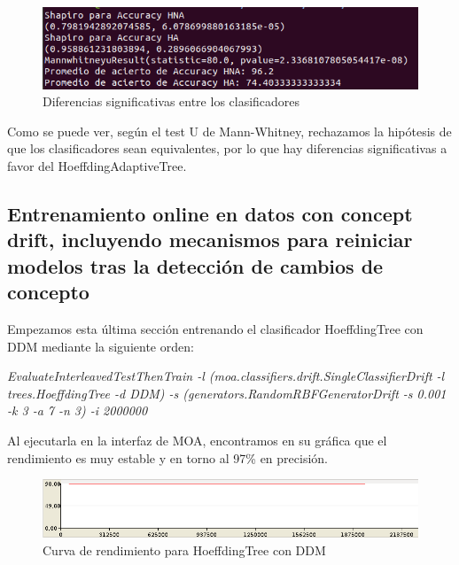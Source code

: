 \begin{figure}[H] %
	\centering
	\includegraphics[scale=0.5]{test4.png}  %
	\caption{Diferencias significativas entre los clasificadores} 
	\label{fig:test4}
\end{figure}

Como se puede ver, según el test U de Mann-Whitney, rechazamos la hipótesis de que los clasificadores sean equivalentes, por lo que hay diferencias significativas a favor del HoeffdingAdaptiveTree.

\subsection{Entrenamiento online en datos con concept drift, incluyendo mecanismos para reiniciar modelos tras la detección de cambios de concepto}

Empezamos esta última sección entrenando el clasificador HoeffdingTree con DDM mediante la siguiente orden:

\textit{EvaluateInterleavedTestThenTrain -l (moa.classifiers.drift.SingleClassifierDrift -l trees.HoeffdingTree -d DDM) -s (generators.RandomRBFGeneratorDrift -s 0.001 -k 3 -a 7 -n 3) -i 2000000}

Al ejecutarla en la interfaz de MOA, encontramos en su gráfica que el rendimiento es muy estable y en torno al 97\% en precisión.

\begin{figure}[H] %
	\centering
	\includegraphics[scale=0.5]{graph51.png}  %
	\caption{Curva de rendimiento para HoeffdingTree con DDM} 
	\label{fig:graph51}
\end{figure}

